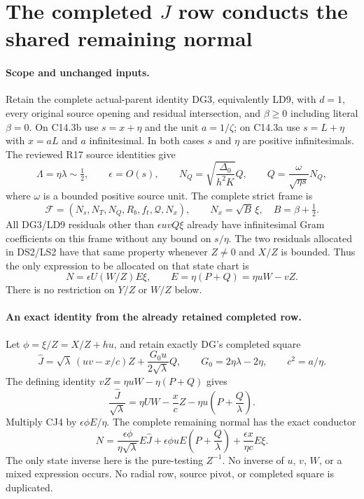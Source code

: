 \section{The completed $J$ row conducts the shared remaining normal}
\label{sec:r18-completed-j}

\paragraph{Scope and unchanged inputs.}
Retain the complete actual-parent identity DG3, equivalently LD9,
with $d=1$, every original source opening and residual intersection,
and $\beta\ge0$ including literal $\beta=0$.  On C14.3b use
$s=x+\eta$ and the unit $a=1/\zeta$; on C14.3a use $s=L+\eta$
with $x=aL$ and $a$ infinitesimal.  In both cases $s$ and $\eta$
are positive infinitesimals.  The reviewed R17 source identities give
\[
 \Lambda=\eta\lambda\sim\tfrac12,\qquad
 \epsilon=O(s),\qquad
 N_Q=\sqrt{\frac{\Delta_0}{h^2K}}Q,
 \qquad
 Q=\frac{\omega}{\sqrt{\eta s}}N_Q,                 \tag{CJ1}
\]
where $\omega$ is a bounded positive source unit.  The complete strict
frame is
\[
 \mathcal F=(N_s,N_T,N_Q,R_b,f_t,\mathcal Q,N_x),
 \qquad N_x=\sqrt B\,\xi,\quad B=\beta+\tfrac12.
                                                               \tag{CJ2}
\]
All DG3/LD9 residuals other than $\epsilon uvQ\xi$ already have
infinitesimal Gram coefficients on this frame without any bound on
$s/\eta$.  The two residuals allocated in DS2/LS2 have that same
property whenever $Z\ne0$ and $X/Z$ is bounded.  Thus the only
expression to be allocated on that state chart is
\[
 N=\epsilon U(W/Z)E\xi,
 \qquad E=\eta(P+Q)=\eta uW-vZ.                    \tag{CJ3}
\]
There is no restriction on $Y/Z$ or $W/Z$ below.

\paragraph{An exact identity from the already retained completed row.}
Let $\phi=\xi/Z=X/Z+hu$, and retain exactly DG's completed square
\[
 \widehat J=\sqrt\lambda\,(uv-x/c)Z
       +\frac{G_0u}{2\sqrt\lambda}Q,
 \qquad G_0=2\eta\lambda-2\eta,\qquad c^2=a/\eta.
\]
The defining identity $vZ=\eta uW-\eta(P+Q)$ gives
\[
 \boxed{\quad
 \frac{\widehat J}{\sqrt\lambda}
 =\eta U W-\frac{x}{c}Z
                -\eta u\left(P+\frac Q\lambda\right).
 \quad}                                                       \tag{CJ4}
\]
Multiply CJ4 by $\epsilon\phi E/\eta$.  The complete remaining
normal has the exact conductor
\[
 \boxed{\quad
 N=\frac{\epsilon\phi}{\eta\sqrt\lambda}E\widehat J
       +\epsilon\phi uE\left(P+\frac Q\lambda\right)
       +\frac{\epsilon x}{\eta c}E\xi .
 \quad}                                                       \tag{CJ5}
\]
The only state inverse here is the pure-testing $Z^{-1}$.  No inverse
of $u$, $v$, $W$, or a mixed expression occurs.  No radial row, source
pivot, or completed square is duplicated.

